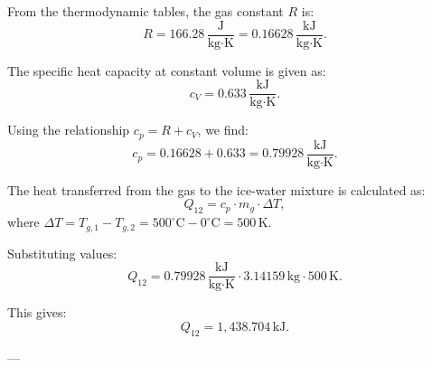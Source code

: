 From the thermodynamic tables, the gas constant \( R \) is:  
\[
R = 166.28 \, \frac{\text{J}}{\text{kg·K}} = 0.16628 \, \frac{\text{kJ}}{\text{kg·K}}.
\]  

The specific heat capacity at constant volume is given as:  
\[
c_V = 0.633 \, \frac{\text{kJ}}{\text{kg·K}}.
\]  

Using the relationship \( c_p = R + c_V \), we find:  
\[
c_p = 0.16628 + 0.633 = 0.79928 \, \frac{\text{kJ}}{\text{kg·K}}.
\]  

The heat transferred from the gas to the ice-water mixture is calculated as:  
\[
Q_{12} = c_p \cdot m_g \cdot \Delta T,
\]  
where \( \Delta T = T_{g,1} - T_{g,2} = 500^\circ\text{C} - 0^\circ\text{C} = 500 \, \text{K} \).  

Substituting values:  
\[
Q_{12} = 0.79928 \, \frac{\text{kJ}}{\text{kg·K}} \cdot 3.14159 \, \text{kg} \cdot 500 \, \text{K}.
\]  

This gives:  
\[
Q_{12} = 1,438.704 \, \text{kJ}.
\]

---